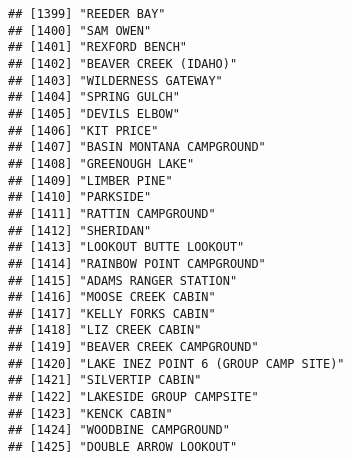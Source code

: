 \documentclass[
]{article}
\begin{document}
\begin{verbatim}
## [1399] "REEDER BAY"                                                                          
## [1400] "SAM OWEN"                                                                            
## [1401] "REXFORD BENCH"                                                                       
## [1402] "BEAVER CREEK (IDAHO)"                                                                
## [1403] "WILDERNESS GATEWAY"                                                                  
## [1404] "SPRING GULCH"                                                                        
## [1405] "DEVILS ELBOW"                                                                        
## [1406] "KIT PRICE"                                                                           
## [1407] "BASIN MONTANA CAMPGROUND"                                                            
## [1408] "GREENOUGH LAKE"                                                                      
## [1409] "LIMBER PINE"                                                                         
## [1410] "PARKSIDE"                                                                            
## [1411] "RATTIN CAMPGROUND"                                                                   
## [1412] "SHERIDAN"                                                                            
## [1413] "LOOKOUT BUTTE LOOKOUT"                                                               
## [1414] "RAINBOW POINT CAMPGROUND"                                                            
## [1415] "ADAMS RANGER STATION"                                                                
## [1416] "MOOSE CREEK CABIN"                                                                   
## [1417] "KELLY FORKS CABIN"                                                                   
## [1418] "LIZ CREEK CABIN"                                                                     
## [1419] "BEAVER CREEK CAMPGROUND"                                                             
## [1420] "LAKE INEZ POINT 6 (GROUP CAMP SITE)"                                                 
## [1421] "SILVERTIP CABIN"                                                                     
## [1422] "LAKESIDE GROUP CAMPSITE"                                                             
## [1423] "KENCK CABIN"                                                                         
## [1424] "WOODBINE CAMPGROUND"                                                                 
## [1425] "DOUBLE ARROW LOOKOUT"                                                                

\end{verbatim}
\end{document}
